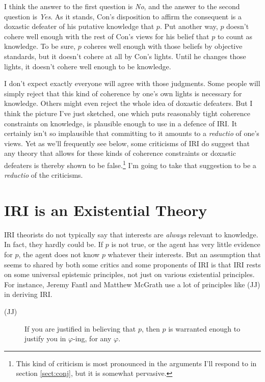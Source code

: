 \documentclass[oneside]{book}
\begin{document}
\noindent I think the answer to the first question is \textit{No}, and the answer to the second question is \textit{Yes}. As it stands, Con's disposition to affirm the consequent is a doxastic defeater of his putative knowledge that $p$. Put another way, $p$ doesn't cohere well enough with the rest of Con's views for his belief that $p$ to count as knowledge. To be sure, $p$ coheres well enough with those beliefs by objective standards, but it doesn't cohere at all by Con's lights. Until he changes those lights, it doesn't cohere well enough to be knowledge.

I don't expect exactly everyone will agree with those judgments. Some people will simply reject that this kind of coherence by one's own lights is necessary for knowledge. Others might even reject the whole idea of doxastic defeaters. But I think the picture I've just sketched, one which puts reasonably tight coherence constraints on knowledge, is plausible enough to use in a defence of IRI. It certainly isn't so implausible that committing to it amounts to a \textit{reductio} of one's views. Yet as we'll frequently see below, some criticisms of IRI do suggest that any theory that allows for these kinds of coherence constraints or doxastic defeaters is thereby shown to be false.\footnote{This kind of criticism is most pronounced in the arguments I'll respond to in section \ref{sect:conj}, but it is somewhat pervasive.} I'm going to take that suggestion to be a \textit{reductio} of the criticisms.

\section{IRI is an Existential Theory} \label{sect:existential}

IRI theorists do not typically say that interests are \textit{always} relevant to knowledge. In fact, they hardly could be. If $p$ is not true, or the agent has very little evidence for $p$, the agent does not know $p$ whatever their interests. But an assumption that seems to shared by both some critics and some proponents of IRI is that IRI rests on some universal epistemic principles, not just on various existential principles. For instance, Jeremy Fantl and Matthew McGrath use a lot of principles like (JJ) in deriving IRI.

\begin{description}
\item[(JJ)] If you are justified in believing that \(p\), then \(p\) is warranted enough to justify you in \(\varphi\)-ing, for any \(\varphi\). \cite[99]{FantlMcGrath2009}
\end{description}
\end{document}
